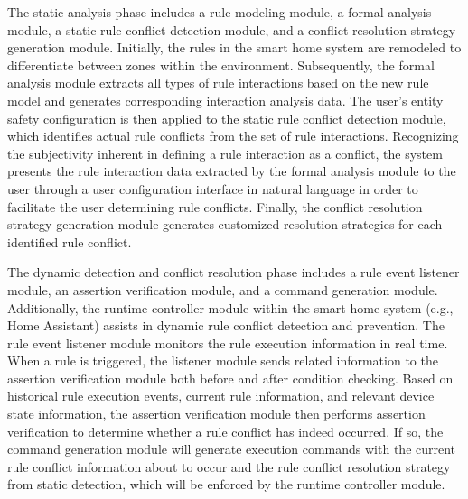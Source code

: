 The static analysis phase includes a rule modeling module, a formal analysis module, a static rule conflict detection module, and a conflict resolution strategy generation module. Initially, the rules in the smart home system are remodeled to differentiate between zones within the environment. Subsequently, the formal analysis module extracts all types of rule interactions based on the new rule model and generates corresponding interaction analysis data. The user's entity safety configuration is then applied to the static rule conflict detection module, which identifies actual rule conflicts from the set of rule interactions. Recognizing the subjectivity inherent in defining a rule interaction as a conflict, the system presents the rule interaction data extracted by the formal analysis module to the user through a user configuration interface in natural language in order to facilitate the user determining rule conflicts. Finally, the conflict resolution strategy generation module generates customized resolution strategies for each identified rule conflict.

The dynamic detection and conflict resolution phase includes a rule event listener module, an assertion verification module, and a command generation module. Additionally, the runtime controller module within the smart home system (e.g., Home Assistant) assists in dynamic rule conflict detection and prevention. The rule event listener module monitors the rule execution information in real time. When a rule is triggered, the listener module sends related information to the assertion verification module both before and after condition checking. Based on historical rule execution events, current rule information, and relevant device state information, the assertion verification module then performs assertion verification to determine whether a rule conflict has indeed occurred. If so, the command generation module will generate execution commands with the current rule conflict information about to occur and the rule conflict resolution strategy from static detection, which will be enforced by the runtime controller module.

